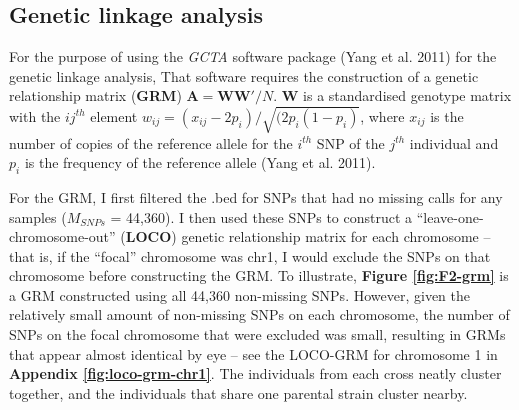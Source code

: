 \documentclass[
]{book}
\begin{document}
\hypertarget{genetic-linkage-analysis}{%
\subsection{Genetic linkage analysis}\label{genetic-linkage-analysis}}

For the purpose of using the \emph{GCTA} software package (Yang et al. 2011) for the genetic linkage analysis, That software requires the construction of a genetic relationship matrix (\textbf{GRM}) \(\textbf{A} = \textbf{WW}'/N\). \(\textbf{W}\) is a standardised genotype matrix with the \(ij^{th}\) element \(w_{ij} = (x_{ij} - 2p_i) / \sqrt{(2p_i(1-p_i)}\), where \(x_{ij}\) is the number of copies of the reference allele for the \(i^{th}\) SNP of the \(j^{th}\) individual and \(p_i\) is the frequency of the reference allele (Yang et al. 2011).

For the GRM, I first filtered the .bed for SNPs that had no missing calls for any samples (\(M_{SNPs}\) = 44,360). I then used these SNPs to construct a ``leave-one-chromosome-out'' (\textbf{LOCO}) genetic relationship matrix for each chromosome -- that is, if the ``focal'' chromosome was chr1, I would exclude the SNPs on that chromosome before constructing the GRM. To illustrate, \textbf{Figure \ref{fig:F2-grm}} is a GRM constructed using all 44,360 non-missing SNPs. However, given the relatively small amount of non-missing SNPs on each chromosome, the number of SNPs on the focal chromosome that were excluded was small, resulting in GRMs that appear almost identical by eye -- see the LOCO-GRM for chromosome 1 in \textbf{Appendix \ref{fig:loco-grm-chr1}}. The individuals from each cross neatly cluster together, and the individuals that share one parental strain cluster nearby.
\end{document}
